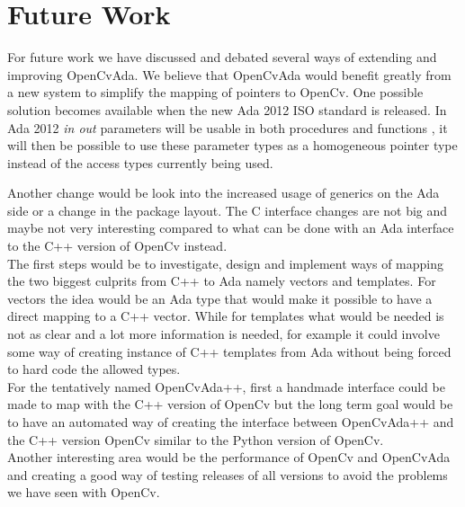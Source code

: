  \chapter{Future Work}
For future work we have discussed and debated several ways of extending and improving OpenCvAda. We believe that OpenCvAda would benefit greatly from a new system to simplify the mapping of pointers to OpenCv. One possible solution becomes available when the new Ada 2012 ISO standard is released. In Ada 2012 \textit{in out} parameters will be usable in both procedures and functions \cite{ada2012chart}, it will then be possible to use these parameter types as a homogeneous pointer type instead of the access types currently being used.

Another change would be look into the increased usage of generics on the Ada side or a change in the package layout. The C interface changes are not big and maybe not very interesting compared to what can be done with an Ada interface to the C++ version of OpenCv instead.
\\
The first steps would be to investigate, design and implement ways of mapping the two biggest culprits from C++ to Ada namely vectors and templates. For vectors the idea would be an Ada type that would make it possible to have a direct mapping to a C++ vector. While for templates what would be needed is not as clear and a lot more information is needed, for example it could involve some way of creating instance of C++ templates from Ada without being forced to hard code the allowed types.
\\
For the tentatively named OpenCvAda++, first a handmade interface could be made to map with the C++ version of OpenCv but the long term goal would be to have an automated way of creating the interface between OpenCvAda++ and the C++ version OpenCv similar to the Python version of OpenCv.
\\
Another interesting area would be the performance of OpenCv and OpenCvAda and creating a good way of testing releases of all versions to avoid the problems we have seen with OpenCv.